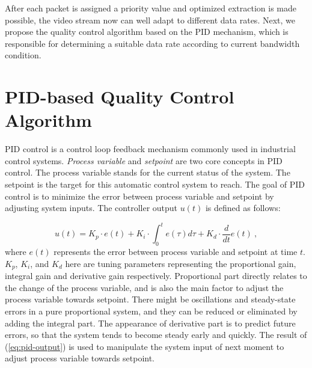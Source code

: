 \documentclass[journal]{IEEEtran}
\begin{document}
After each packet is assigned a priority value and optimized extraction is made possible, the video stream now can well adapt to different data rates. Next, we propose the quality control algorithm based on the PID mechanism, which is responsible for determining a suitable data rate according to current bandwidth condition.

\section{PID-based Quality Control Algorithm}
\label{sec:quality-control}

PID control \cite{PID}\cite{Astrom02} is a control loop feedback mechanism commonly used in industrial control systems. \textit{Process variable} and \textit{setpoint} are two core concepts in PID control. The process variable stands for the current status of the system. The setpoint is the target for this automatic control system to reach. The goal of PID control is to minimize the error between process variable and setpoint by adjusting system inputs. The controller output $u(t)$ is defined as follows:

\begin{equation}
\label{eq:pid-output}
u(t) = {K_p} \cdot e(t) + {K_i} \cdot \int_0^t {e(\tau )d\tau }  + {K_d} \cdot \frac{d}{{dt}}e(t) \: ,
\end{equation}
where $e(t)$ represents the error between process variable and setpoint at time $t$. $K_p$, $K_i$, and $K_d$ here are tuning parameters representing the proportional gain, integral gain and derivative gain respectively. Proportional part directly relates to the change of the process variable, and is also the main factor to adjust the process variable towards setpoint. There might be oscillations and steady-state errors in a pure proportional system, and they can be reduced or eliminated by adding the integral part. The appearance of derivative part is to predict future errors, so that the system tends to become steady early and quickly. The result of (\ref{eq:pid-output}) is used to manipulate the system input of next moment to adjust process variable towards setpoint.
\end{document}

